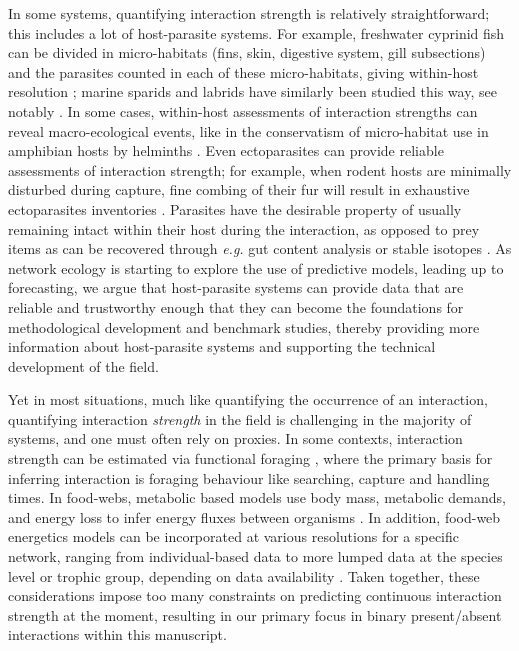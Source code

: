 In some systems, quantifying interaction strength is relatively
straightforward; this includes a lot of host-parasite systems. For
example, freshwater cyprinid fish can be divided in micro-habitats
(fins, skin, digestive system, gill subsections) and the parasites
counted in each of these micro-habitats, giving within-host resolution
\cite{Simkova2002AbuRel}; marine sparids and labrids have similarly been
studied this way, see notably \cite{Sasal1999ComStr,
Desdevises2006DetPar, Morand2002InvPat}. In some cases, within-host
assessments of interaction strengths can reveal macro-ecological events,
like in the conservatism of micro-habitat use in amphibian hosts by
helminths \cite{Badets2011CorEar}. Even ectoparasites can provide
reliable assessments of interaction strength; for example, when rodent
hosts are minimally disturbed during capture, fine combing of their fur
will result in exhaustive ectoparasites inventories
\cite{Hadfield2014TalTwo, Karbowiak2019ComImm, Matthee2020DivDis,
Sanchez2014PosCoo, Dickinson2020SamSca}. Parasites have the
desirable property of usually remaining intact within their host during
the interaction, as opposed to prey items as can be recovered through
\emph{e.g.} gut content analysis or stable isotopes
\cite{Macias-Hernandez2018MolGut, Schmid-Araya2016TroPos}. As network
ecology is starting to explore the use of predictive models, leading up
to forecasting, we argue that host-parasite systems can provide data
that are reliable and trustworthy enough that they can become the
foundations for methodological development and benchmark studies,
thereby providing more information about host-parasite systems and
supporting the technical development of the field.

Yet in most situations, much like quantifying the occurrence of an
interaction, quantifying interaction \emph{strength} in the field is
challenging in the majority of systems, and one must often rely on
proxies. In some contexts, interaction strength can be estimated via
functional foraging \cite{Portalier2019MecPre}, where the primary basis
for inferring interaction is foraging behaviour like searching, capture
and handling times. In food-webs, metabolic based models use body mass,
metabolic demands, and energy loss to infer energy fluxes between
organisms \cite{Yodzis1992BodSiz, Berlow2009SimPre}. In addition,
food-web energetics models can be incorporated at various resolutions
for a specific network, ranging from individual-based data to more
lumped data at the species level or trophic group, depending on data
availability \cite{Barnes2018EneFlu, Berlow2009SimPre}. Taken together,
these considerations impose too many constraints on predicting
continuous interaction strength at the moment, resulting in our primary
focus in binary present/absent interactions within this manuscript.

